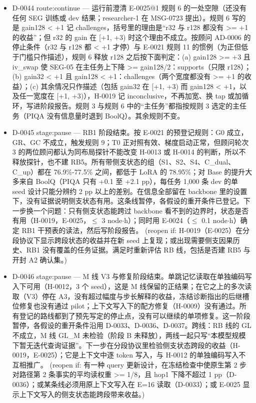 \documentclass[11pt]{article}
\begin{document}
\begin{itemize}
\item D-0044 route:continue --- 运行前澄清 E-0025@1 规则 6 的一处空隙（还没有任何 SEG 训练或 dev 结果；researcher-1 在 MSG-0723 提出）。规则 6 写的是 gain128 \textless{} +1 记 challenges，括号里的理由是``r32 与 r128 都没有 \textgreater{}= +1 的收益''；但 r32 的 gain 在 [+1, +3) 时这个理由不成立。按顾问 AD-0006 的停止条件（r32 与 r128 都 \textless{} +1 才停）与 E-0021 规则 11 的惯例（为正但低于门槛只作描述），规则 6 释放 r128 之后按下面判定：(a) gain128 \textgreater{}= +3 且 iv\_swap 使 SEG-05 在主任务上下降 \textgreater{}= gain128/2：supports（只限 r128）；(b) gain32 \textless{} +1 且 gain128 \textless{} +1：challenges（两个宽度都没有 \textgreater{}= +1 的收益）；(c) 其余情况只作描述（包括 gain32 在 [+1, +3) 而 gain128 \textless{} +1，以及任一宽度在 [+1, +3)），H-0019 记 inconclusive，不再加宽、换 tap 或加循环，写进阶段报告。规则 3 与规则 6 中的``主任务''都指按规则 3 选定的主任务（PIQA 没有信息量时退到 BoolQ）。其余规则不变。
\item D-0045 stage:pause --- RB1 阶段结束。按 E-0021 的预登记规则：G0 成立，GR、GC 不成立，触发规则 9；T0 正对照有效、梯度启动正常，但顾问轮次 3 的两位顾问都认为同布局探针不能改变 H-0013 或 H-0014 的判断，所以不释放探针，也不建 RB5。所有带侧支状态的组（S1、S2、S4、C\_dual、C\_up）都在 76.9\%-77.5\% 之间，都低于 LoRA 的 78.95\%；对 Base 的提升大多来自 BoolQ（PIQA 只有 +0.1 至 +2.1 pp），每任务 1,000 条 dev 的单 seed 设计只能分辨约 2 pp 以上的差别。在信息全部留在 backbone 里的设置下，没有证据说明侧支状态有用。这条线暂停，各假设的重开条件已登记。下一步换一个问题：只有侧支状态能跨过 backbone 看不到的边界时，状态是否有用（H-0019，E-0025，\ensuremath{\leq} 3 node\ensuremath{\cdot}h）；同时用 E-0024（\ensuremath{\leq} 0.1 node\ensuremath{\cdot}h）确定 RB1 干预表的读法，然后写阶段报告。 (reopen if: H-0019（E-0025）在分段协议下显示跨段状态的收益并在新 seed 上复现；或出现需要侧支因果历史、RB1 没有覆盖的任务证据。满足时重新评估 RB 线，包括是否建 RB5 与开封 A2 确认集。)
\item D-0046 stage:pause --- M 线 V3 与修复阶段结束。单跳记忆读取在单独编码写入下可用（H-0012，3 个 seed），这是 M 线保留的正结果；在它之上的多次读取（V3）停在 A3，没有超过幅度与步长解释的收益，冻结诊断指出的后继槽位修复也没有通过 pilot；上下文写入下的配方修复（H-0009）没有通过。所有登记的路线都到了预先写定的停止点，没有可以继续的单项修复。这一阶段暂停，各假设的重开条件沿用 D-0033、D-0036、D-0037。跨线：RB 线的 GL 不成立，M 线 GL\_M 未检验（阶段 B 未释放），两线一起只写``本模型规模下暂无迭代查询证据''。下一步在分段协议里检验侧支状态跨段的收益（H-0019，E-0025）；它是上下文中逐 token 写入，与 H-0012 的单独编码写入不互相推广。 (reopen if: 有一种 query 更新设计，在冻结检查中使原生第 2 步对路径第 2 条事实的平均读权重 \textgreater{}= 1/8，且 hop1 下降不超过 1 pp（D-0036）；或某条线必须用原上下文写入在 E=16 读取（D-0033）；或 E-0025 显示上下文写入的侧支状态能跨段带来收益。)

\end{itemize}
\end{document}
